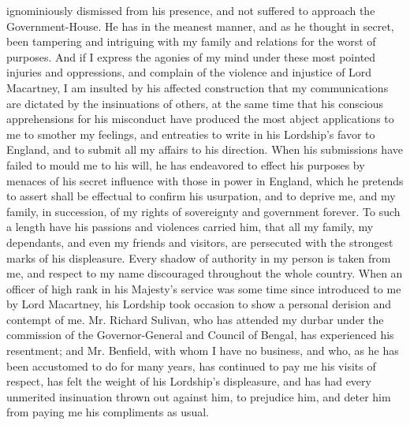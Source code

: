 ignominiously dismissed from his presence, and not suffered to approach the Government-House. He has in the meanest manner, and as he thought in secret, been tampering and intriguing with my family and relations for the worst of purposes. And if I express the agonies of my mind under these most pointed injuries and oppressions, and complain of the violence and injustice of Lord Macartney, I am insulted by his affected construction that my communications are dictated by the insinuations of others, at the same time that his conscious apprehensions for his misconduct have produced the most abject applications to me to smother my feelings, and entreaties to write in his Lordship's favor to England, and to submit all my affairs to his direction. When his submissions have failed to mould me to his will, he has endeavored to effect his purposes by menaces of his secret influence with those in power in England, which he pretends to assert shall be effectual to confirm his usurpation, and to deprive me, and my family, in succession, of my rights of sovereignty and government forever. To such a length have his passions and violences carried him, that all my family, my dependants, and even my friends and visitors, are persecuted with the strongest marks of his displeasure. Every shadow of authority in my person is taken from me, and respect to my name discouraged throughout the whole country. When an officer of high rank in his Majesty's service was some time since introduced to me by Lord Macartney, his Lordship took occasion to show a personal derision and contempt of me. Mr. Richard Sulivan, who has attended my durbar under the commission of the Governor-General and Council of Bengal, has experienced his resentment; and Mr. Benfield, with whom I have no business, and who, as he has been accustomed to do for many years, has continued to pay me his visits of respect, has felt the weight of his Lordship's displeasure, and has had every unmerited insinuation thrown out against him, to prejudice him, and deter him from paying me his compliments as usual.

